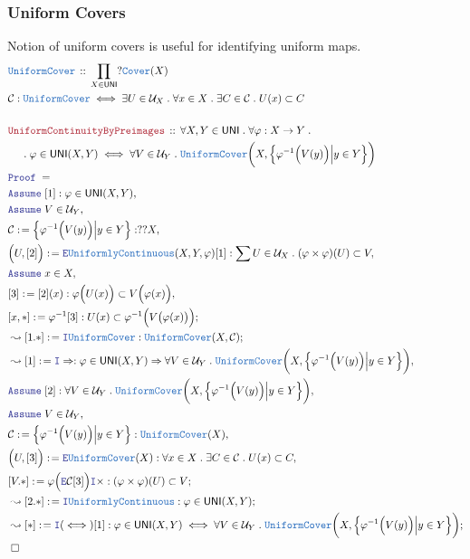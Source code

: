 \documentclass[12pt]{scrartcl}
\newcommand{\TYPE}[1]{\textcolor{NavyBlue}{\mathtt{#1}}}
\newcommand{\LOGIC}[1]{\textcolor{Blue}{\mathtt{#1}}}
\newcommand{\THM}[1]{\textcolor{Maroon}{\mathtt{#1}}}
\renewcommand{\.}{\; . \;}
\newcommand{\de}{: \kern 0.1pc =}
\newcommand{\Theorem}[2]{& \THM{#1} \, :: \, #2 \\ & \Proof = \\ }
\newcommand{\DeclareType}[2]{& \TYPE{#1} \, :: \, #2 \\}
\newcommand{\DefineType}[3]{& #1 : \TYPE{#2} \iff #3 \\}
\newcommand{\NewLine}{\\ & \kern 1pc}
\newcommand{\Page}[1]{ \begin{align*} #1 \end{align*}   }
\newcommand{\Imply}{\Rightarrow}
\newcommand{\Cover}{\TYPE{Cover}}
\newcommand{\Say}[3]{& #1 \de #2 : #3, \\}
\newcommand{\Conclude}[3]{& #1 \de #2 : #3; \\}
\newcommand{\Derive}[3]{& \leadsto #1 \de #2 : #3, \\}
\newcommand{\DeriveConclude}[3]{& \leadsto #1 \de #2 : #3 ; \\}
\newcommand{\Assume}[2]{& \LOGIC{Assume} \; #1 : #2, \\}
\newcommand{\AssumeIn}[2]{& \LOGIC{Assume} \; #1 \in #2, \\}
\newcommand{\Intro}{\LOGIC{I}}
\newcommand{\Elim}{\LOGIC{E}}
\newcommand{\QED}{\; \square}
\newcommand{\EndProof}{& \QED \\}
\newcommand{\Proof}{\LOGIC{Proof} \; }
\renewcommand{\C}{\mathcal{C}}
\renewcommand{\U}{\mathcal{U}}
\newcommand{\UNI}{\mathsf{UNI}}
\newcommand{\UC}{\TYPE{UniformlyContinuous}}
\newcommand{\UniCov}{\TYPE{UniformCover}}
\begin{document}
\subsubsection{Uniform Covers}
Notion of uniform covers is useful for identifying uniform maps.
\Page{
	\DeclareType{\UniCov}{\prod_{X \in \UNI} ?\Cover(X)}
	\DefineType{\C}{\UniCov}{
		\exists U \in \U_X \. 
		\forall x \in X \. 
		\exists C \in \C \.
		U(x) \subset C 
	}
	\\
	\Theorem{UniformContinuityByPreimages}
	{
		\forall X,Y \in \UNI \.
		\forall \varphi : X \to Y \. \NewLine \.
		\varphi \in \UNI(X,Y) 
		\iff
		\forall V \in \U_Y \. 
		\UniCov\bigg(X,\Big\{ \varphi^{-1}\Big( V(y) \Big) \Big|   y \in Y \Big\} \bigg)
	}
	\Assume{[1]}{\varphi \in \UNI(X,Y)}
	\AssumeIn{V}{\U_Y}
	\Say{\C}{\Big\{ \varphi^{-1}\Big( V(y) \Big) \Big|   y \in Y \Big\}}{??X}
	\Say{\Big(U,[2]\Big)}{\Elim \UC(X,Y,\varphi)[1]}
	{
		\sum U \in \U_X \.  (\varphi \times \varphi)(U) \subset V
	}
	\AssumeIn{x}{X}
	\Say{[3]}{[2](x)}
	{
		\varphi\Big( U(x) \Big) \subset  V\Big( \varphi(x) \Big)
	}
	\Conclude{[x,*]}{ \varphi^{-1}[3]}
	{ 
		U(x) \subset \varphi^{-1}\Big( V\big(\varphi(x)\big) \Big)
	}
	\DeriveConclude{[1.*]}{\Intro \UniCov}{\UniCov(X,\C)}
	\Derive{[1]}{\Intro \Imply}
	{
		\varphi \in \UNI(X,Y) 
		\Imply
		\forall V \in \U_Y \. 
		\UniCov\bigg(X,\Big\{ \varphi^{-1}\Big( V(y) \Big) \Big|   y \in Y \Big\} \bigg)
	}
	\Assume{[2]}
	{
		\forall V \in \U_Y \. 
		\UniCov\bigg(X,\Big\{ \varphi^{-1}\Big( V(y) \Big) \Big|   y \in Y \Big\} \bigg)
	}
	\AssumeIn{V}{\U_Y}
	\Say{\C}{\Big\{ \varphi^{-1}\Big( V(y) \Big) \Big|   y \in Y \Big\}}{\UniCov(X)}
	\Say{\Big(U,[3]\Big)}{\Elim \UniCov(X)}
	{
		\forall x \in X \. 
		\exists C \in \C \.
		U(x) \subset C 
	}
	\Conclude{[V.*]}{\varphi\Big(\Elim \C [3]\Big)\Intro \times}
	{
		(\varphi \times \varphi)(U) \subset V
	}
	\DeriveConclude{[2.*]}{\Intro \UC}{\varphi \in \UNI(X,Y)}
	\DeriveConclude{[*]}{\Intro (\iff) [1]}
	{
		\varphi \in \UNI(X,Y) 
		\iff
		\forall V \in \U_Y \. 
		\UniCov\bigg(X,\Big\{ \varphi^{-1}\Big( V(y) \Big) \Big|   y \in Y \Big\} \bigg)
	}
	\EndProof	
}
\newpage
\end{document}
